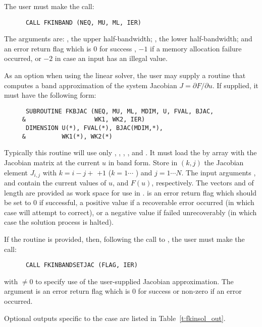 \begin{Steps}
  The user must make the call:
\begin{verbatim}
      CALL FKINBAND (NEQ, MU, ML, IER)
\end{verbatim}
  The arguments are: , the upper half-bandwidth; , 
  the lower half-bandwidth; and  an error return flag which is 
  $0$ for success , $-1$ if a memory allocation failure occurred, or $-2$ 
  in case an input has an illegal value.     
  
  As an option when using the {\band} linear solver, the user may supply a
  routine that computes a band approximation of the system Jacobian 
  $J = \partial F / \partial u$. If supplied, it must have the following form:
\begin{verbatim}
      SUBROUTINE FKBJAC (NEQ, MU, ML, MDIM, U, FVAL, BJAC,
     &                   WK1, WK2, IER)
      DIMENSION U(*), FVAL(*), BJAC(MDIM,*),
     &          WK1(*), WK2(*)
\end{verbatim}
  Typically this routine will use only , , ,
  , and .
  It must load the  by  array  with the Jacobian matrix
  at the current $u$ in band form.  Store in $(k,j)$ the Jacobian
  element $J_{i,j}$ with $k = i - j + $  $ + 1$ ($k = 1 \cdots $
  ) and $j = 1 \cdots N$.
  The input arguments , and  contain the current
  values of $u$, and $F(u)$, respectively.
  The vectors  and 
  of length  are provided as work space for use in
  .
   is an error return flag which should be set to $0$ if successful,
  a positive value if a recoverable error occurred (in which case {\kinsol} will
  attempt to correct), or a negative value if  failed unrecoverably
  (in which case the solution process is halted).

  If the  routine is provided, then, following the call to ,
  the user must make the call:
\begin{verbatim}
      CALL FKINBANDSETJAC (FLAG, IER)
\end{verbatim}
  with  $\neq 0$ to specify use of the user-supplied Jacobian approximation.
  The argument  is an error return flag which is $0$ 
  for success or non-zero if an error occurred.
  
  Optional outputs specific to the {\band} case are listed in Table~\ref{t:fkinsol_out}.


\end{Steps}
